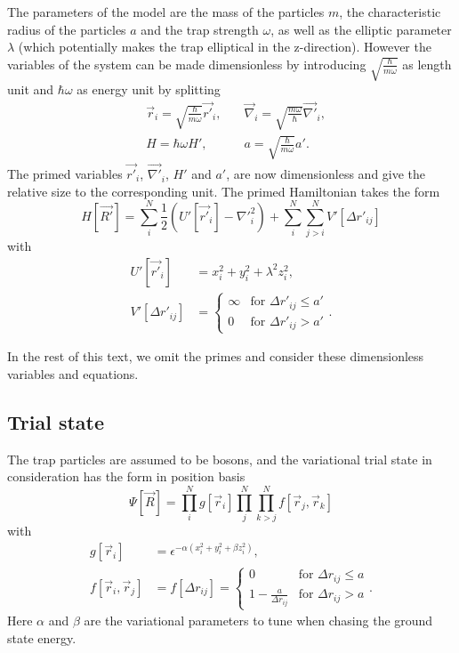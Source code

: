 \documentclass[a4paper,8pt]{article}
\begin{document}
\begin{multicols}{2}
The parameters of the model are the mass of the particles $m$, the characteristic radius of the particles $a$ and the trap strength $\omega$, as well as the elliptic parameter $\lambda$ (which potentially makes the trap elliptical in the z-direction). However the variables of the system can be made dimensionless by introducing $\sqrt{\frac{\hbar}{m\omega}}$ as length unit and $\hbar\omega$ as energy unit by splitting
\begin{align}
&\vec{r}_i = \sqrt{\frac{\hbar}{m\omega}}\vec{r'}_i, \quad &\vec{\nabla}_i = \sqrt{\frac{m\omega}{\hbar}}\vec{\nabla'}_i, \nonumber\\
&H = \hbar\omega H', \quad\quad &a = \sqrt{\frac{\hbar}{m\omega}}a'. \nonumber
\end{align}
The primed variables $\vec{r'}_i$, $\vec{\nabla'}_i$, $H'$ and $a'$, are now dimensionless and give the relative size to the corresponding unit. The primed Hamiltonian takes the form
\begin{equation}
H[\vec{R'}] = \sum\limits_i^N \frac{1}{2}\left( U'[\vec{r'}_i] - {\nabla'}_i^2\right) + \sum\limits_i^N\sum\limits_{j > i}^N V'[\Delta{r'}_{ij}] \label{Hamiltonian}
\end{equation}
with
\begin{align}
U'[\vec{r'}_i] &= x_i^2+y_i^2+\lambda^2z_i^2, \label{U}\\
V'[\Delta{r'}_{ij}] &=\begin{cases} \infty & \text{for $\Delta{r'}_{ij} \leq a'$} \\
0 & \text{for $\Delta{r'}_{ij} > a'$} \end{cases}. \label{V}
\end{align}

In the rest of this text, we omit the primes and consider these dimensionless variables and equations.

\subsection{Trial state} \label{trialstate}

The trap particles are assumed to be bosons, and the variational trial state in consideration has the form in position basis
\begin{equation}
\Psi[\vec{R}] = \prod\limits_i^N g[\vec{r}_i] \prod\limits_j^N\prod\limits_{k > j}^N f[\vec{r}_j,\vec{r}_k] \label{trialstate}
\end{equation}
with
\begin{align}
g[\vec{r}_i] &= \epsilon^{-\alpha\left(x_i^2+y_i^2+ \beta z_i^2\right)}, \label{g}\\
f[\vec{r}_i,\vec{r}_j] &= f[\Delta{r}_{ij}] = \begin{cases} 0 & \text{for $\Delta{r}_{ij} \leq a$} \\
1-\frac{a}{\Delta{r}_{ij}} & \text{for $\Delta{r}_{ij} > a$} \end{cases}. \label{f}
\end{align}
Here $\alpha$ and $\beta$ are the variational parameters to tune when chasing the ground state energy.



\end{multicols}
\end{document}
